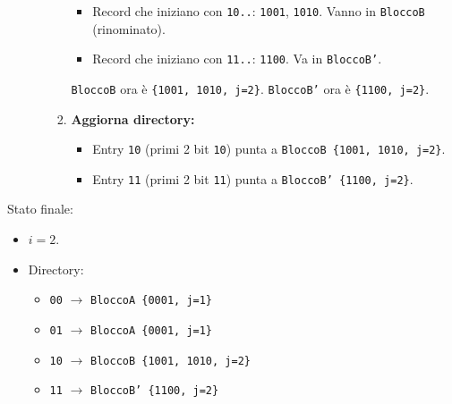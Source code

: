 \begin{enumerate}
\begin{enumerate}
\begin{enumerate}
            \begin{itemize}
                \item Record che iniziano con \texttt{10..}: \texttt{1001}, \texttt{1010}. Vanno in \texttt{BloccoB} (rinominato).
                \item Record che iniziano con \texttt{11..}: \texttt{1100}. Va in \texttt{BloccoB'}.
            \end{itemize}
            \texttt{BloccoB} ora è \texttt{\{1001, 1010, j=2\}}. \texttt{BloccoB'} ora è \texttt{\{1100, j=2\}}.
            \item \textbf{Aggiorna directory:}
            \begin{itemize}
                \item Entry \texttt{10} (primi 2 bit \texttt{10}) punta a \texttt{BloccoB \{1001, 1010, j=2\}}.
                \item Entry \texttt{11} (primi 2 bit \texttt{11}) punta a \texttt{BloccoB' \{1100, j=2\}}.
            \end{itemize}
        \end{enumerate}
    \end{enumerate}
\end{enumerate}

Stato finale:
\begin{itemize}
    \item $i = 2$.
    \item Directory:
    \begin{itemize}
        \item \texttt{00} $\rightarrow$ \texttt{BloccoA \{0001, j=1\}}
        \item \texttt{01} $\rightarrow$ \texttt{BloccoA \{0001, j=1\}}
        \item \texttt{10} $\rightarrow$ \texttt{BloccoB \{1001, 1010, j=2\}}
        \item \texttt{11} $\rightarrow$ \texttt{BloccoB' \{1100, j=2\}}
    \end{itemize}
\end{itemize}

